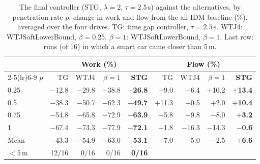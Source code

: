 \begin{table}[htbp]
\centering
\small
\caption{The final controller (STG, $\lambda=2$, $\tau=2.5$\,s) against the alternatives, by penetration rate $p$: change in work and flow from the all-IDM baseline (\%), averaged over the four drives. TG: time gap controller, $\tau=2.5$\,s. WTJ4: WTJSoftLowerBound, $\beta=0.25$. $\beta=1$: WTJSoftLowerBound, $\beta=1$. Last row: runs (of 16) in which a smart car came closer than 5\,m.}
\label{tab:compare}
\begin{tabular}{lrrrrrrrr}
\toprule
 & \multicolumn{4}{c}{Work (\%)} & \multicolumn{4}{c}{Flow (\%)} \\
\cmidrule(lr){2-5}\cmidrule(lr){6-9}
$p$ & TG & WTJ4 & $\beta=1$ & \textbf{STG} & TG & WTJ4 & $\beta=1$ & \textbf{STG} \\
\midrule
0.25 & $-$12.8 & $-$29.8 & $-$38.8 & \textbf{$-$26.8} & $+$9.0 & $+$6.4 & $+$10.2 & \textbf{$+$13.4} \\
0.5 & $-$38.3 & $-$50.7 & $-$62.3 & \textbf{$-$49.7} & $+$11.3 & $-$0.5 & $+$2.0 & \textbf{$+$10.4} \\
0.75 & $-$54.8 & $-$65.8 & $-$72.9 & \textbf{$-$63.9} & $+$5.8 & $-$9.8 & $-$8.0 & \textbf{$+$3.2} \\
1 & $-$67.4 & $-$73.3 & $-$77.9 & \textbf{$-$72.1} & $+$1.8 & $-$16.3 & $-$14.3 & \textbf{$-$0.6} \\
\midrule
Mean & $-$43.3 & $-$54.9 & $-$63.0 & \textbf{$-$53.1} & $+$7.0 & $-$5.0 & $-$2.5 & \textbf{$+$6.6} \\
\midrule
$<$5\,m & 12/16 & 0/16 & 0/16 & \textbf{0/16} &  &  &  &  \\
\bottomrule
\end{tabular}
\end{table}
